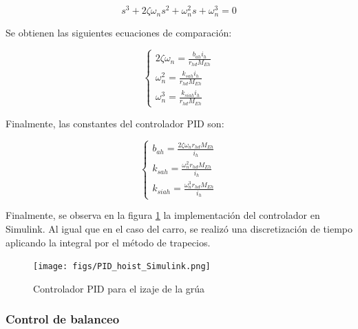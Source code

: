 \documentclass{article}
\begin{document}
            \begin{equation}
                s^3 + 2 \zeta \omega_n s^2 + \omega_n^2 s + \omega_n^3 = 0
            \end{equation}
            
            Se obtienen las siguientes ecuaciones de comparación:
            
            \begin{equation}
                \begin{cases}
                    2 \zeta \omega_n = \frac{b_{ah} i_h}{r_{hd} M_{Eh}} \\
                    \omega_n^2 = \frac{k_{sah} i_h}{r_{hd} M_{Eh}} \\
                    \omega_n^3 = \frac{k_{siah} i_h}{r_{hd} M_{Eh}}
                \end{cases}
            \end{equation}
            
            Finalmente, las constantes del controlador PID son:
            
            \begin{equation}
                \begin{cases}
                    b_{ah} = \frac{2 \zeta \omega_n r_{hd} M_{Eh}}{i_h} \\
                    k_{sah} = \frac{\omega_n^2 r_{hd} M_{Eh}}{i_h} \\
                    k_{siah} = \frac{\omega_n^3 r_{hd} M_{Eh}}{i_h}
                \end{cases}
            \end{equation}

            Finalmente, se observa en la figura \ref{fig:pid_hoist_simulink} la implementación del controlador en Simulink. Al igual que en el caso del carro, se realizó una discretización de tiempo aplicando la integral por el método de trapecios.

            \begin{figure}[H]
                \centering
                \texttt{[image: figs/PID\_hoist\_Simulink.png]}
                \caption{Controlador PID para el izaje de la grúa}
                \label{fig:pid_hoist_simulink}
            \end{figure}
        


        \subsubsection{Control de balanceo}
\end{document}
